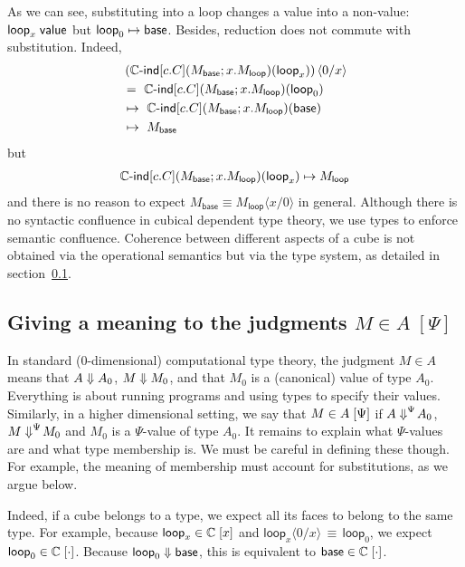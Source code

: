 \documentclass{article}
\newcommand\Circle{\mathbb{C}}
\newcommand\Base{\mathsf{base}}
\newcommand\Loop{\mathsf{loop}}
\newcommand\CIndOp{\Circle\textsf{-ind}}
\newcommand\CInd[4]{\CIndOp\Squares{#1}\Parens*{#2;#3}\Parens{#4}}
\newcommand\DimSubst[3]{#3\langle{#1}/{#2}\rangle}
\DeclarePairedDelimiter\Parens{\lparen}{\rparen}
\DeclarePairedDelimiter\Squares{[}{]}
\begin{document}
As we can see, substituting into a loop changes a value into a non-value: 
$\valueJ{\Loop_x}$ but $\step{\Loop_0}{\Base}$. Besides, reduction does not 
commute with substitution. Indeed,
\begin{align*}
  & \DimSubst{0}{x}{\left(\CInd{c.C}{M_{\Base}}{x.M_{\Loop}}{\Loop_x}\right)} \\
  &= \ \CInd{c.C}{M_{\Base}}{x.M_{\Loop}}{\Loop_0} \\
  &\mapsto \ \CInd{c.C}{M_{\Base}}{x.M_{\Loop}}{\Base} \\
  &\mapsto \ M_{\Base}
\end{align*}
but
\begin{align*}
  \step{  \CInd{c.C}{M_{\Base}}{x.M_{\Loop}}{\Loop_x}  }{ M_{\Loop}  }
\end{align*}
and there is no reason to expect
$M_{\Base} \equiv \DimSubst{x}{0}{M_{\Loop}}$ in general.  Although
there is no syntactic confluence in cubical dependent type theory, we
use types to enforce semantic confluence. Coherence between different
aspects of a cube is not obtained via the operational semantics but
via the type system, as detailed in section~\ref{sec:meaning}.



\subsection{Giving a meaning to the judgments $M \in A \;[\Psi]$}
\label{sec:meaning}

In standard ($0$-dimensional) computational type theory, the judgment
$M \in A$ means that $A \mathrel{\Downarrow} A_0$, $M \mathrel{\Downarrow} M_0$, and that $M_0$ is a
(canonical) value of type $A_0$. Everything is about running programs and
using types to specify their values. Similarly, in a higher dimensional setting,
we say that $M \in A \; [\Psi]$ if $A \mathrel{\Downarrow}^{\Psi}\! A_0$, 
$M \mathrel{\Downarrow}^{\Psi}\! M_0$ and $M_0$ is a $\Psi$-value of type $A_0$. It remains to
explain what $\Psi$-values are and what type membership is. We must be careful
in defining these though. For example, the meaning of membership must account for
substitutions, as we argue below.

Indeed, if a cube belongs to a type, we expect all its faces to belong
to the same type. For example, because
$\InTypeDim{\Loop_x}{\Circle}{x}$ and
$\DimSubst{0}{x}{\Loop_x} \,\equiv\, \Loop_0$, we expect
$\InTypeDim{\Loop_0}{\Circle}{\cdot}$. Because $\eval{\Loop_0}{\Base}$, this is
equivalent to $\InTypeDim{\Base}{\Circle}{\cdot}$.
\end{document}
